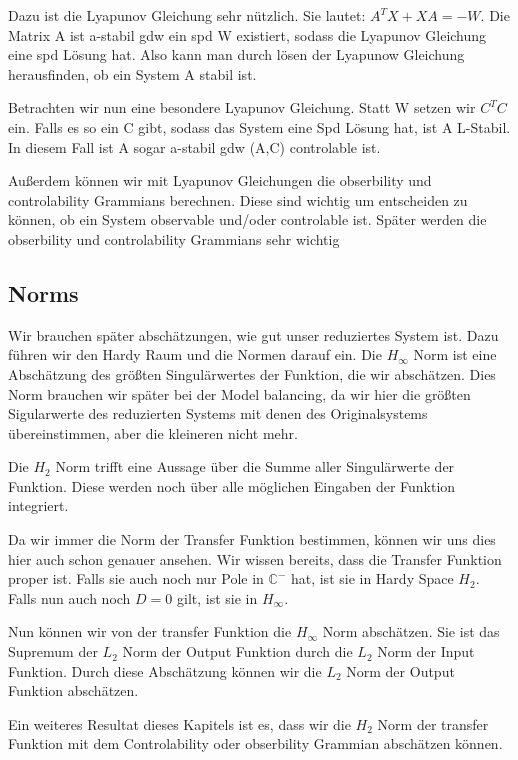 \documentclass[]{article}
\begin{document}
 Dazu ist die Lyapunov Gleichung sehr nützlich. Sie lautet: $A^T X + XA = -W$. Die Matrix A ist a-stabil gdw ein spd W existiert, sodass die Lyapunov Gleichung eine spd Lösung hat. Also kann man durch lösen der Lyapunow Gleichung herausfinden, ob ein System A stabil ist.
 
 Betrachten wir nun eine besondere Lyapunov Gleichung. Statt W setzen wir $C^T C$ ein. Falls es so ein C gibt, sodass das System eine Spd Lösung hat, ist A L-Stabil. In diesem Fall ist A sogar a-stabil gdw (A,C) controlable ist. 
 
 Außerdem können wir mit Lyapunov Gleichungen die obserbility und controlability Grammians berechnen. Diese sind wichtig um entscheiden zu können, ob ein System observable und/oder controlable ist. Später werden die obserbility und controlability Grammians sehr wichtig
 
 \subsection{Norms}
 
 Wir brauchen später abschätzungen, wie gut unser reduziertes System ist. Dazu führen wir den Hardy Raum und die Normen darauf ein. Die $H_{\infty}$  Norm ist eine Abschätzung des größten Singulärwertes der Funktion, die wir abschätzen. Dies Norm brauchen wir später bei der Model balancing, da wir hier die größten Sigularwerte des reduzierten Systems  mit denen des Originalsystems übereinstimmen, aber die kleineren nicht mehr. 
 
 Die $H_2$ Norm trifft eine Aussage über die Summe aller Singulärwerte der Funktion. Diese werden noch über alle möglichen Eingaben der Funktion integriert.
 
 Da wir immer die Norm der Transfer Funktion bestimmen, können wir uns dies hier auch schon genauer ansehen. Wir wissen bereits, dass die Transfer Funktion proper ist. Falls sie auch noch nur Pole in $\mathbb{C}^-$ hat, ist sie in Hardy Space $H_2$. Falls nun auch noch $D=0$ gilt, ist sie in $H_{\infty}$.    
  
 Nun können wir von der transfer Funktion die $H_{\infty}$  Norm abschätzen. Sie ist das Supremum der $L_2$ Norm der Output Funktion durch die $L_2$ Norm der Input Funktion. Durch diese Abschätzung können wir die $L_2$ Norm der Output Funktion abschätzen. 
 
 Ein weiteres Resultat dieses Kapitels ist es, dass wir die $H_2$ Norm der transfer Funktion mit dem Controlability oder obserbility Grammian abschätzen können. 
 
\end{document}
